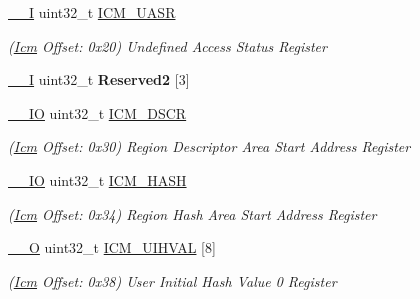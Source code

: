 \begin{DoxyCompactItemize}
\mbox{\label{structIcm_ad82efad8c6f9e75fd36dc3b5efd7c937}} 
\mbox{\hyperlink{core__cm7_8h_af63697ed9952cc71e1225efe205f6cd3}{\+\_\+\+\_\+I}} uint32\+\_\+t \mbox{\hyperlink{structIcm_ad82efad8c6f9e75fd36dc3b5efd7c937}{I\+C\+M\+\_\+\+U\+A\+SR}}
\begin{DoxyCompactList}\small\item\em (\mbox{\hyperlink{structIcm}{Icm}} Offset\+: 0x20) Undefined Access Status Register \end{DoxyCompactList}\item 
\mbox{\label{structIcm_a708a812dd1cdd6d52926abeb8b060f90}} 
\mbox{\hyperlink{core__cm7_8h_af63697ed9952cc71e1225efe205f6cd3}{\+\_\+\+\_\+I}} uint32\+\_\+t {\bfseries Reserved2} \mbox{[}3\mbox{]}
\item 
\mbox{\label{structIcm_a3c368d0b5b5729e3327f9c08da881548}} 
\mbox{\hyperlink{core__cm7_8h_aec43007d9998a0a0e01faede4133d6be}{\+\_\+\+\_\+\+IO}} uint32\+\_\+t \mbox{\hyperlink{structIcm_a3c368d0b5b5729e3327f9c08da881548}{I\+C\+M\+\_\+\+D\+S\+CR}}
\begin{DoxyCompactList}\small\item\em (\mbox{\hyperlink{structIcm}{Icm}} Offset\+: 0x30) Region Descriptor Area Start Address Register \end{DoxyCompactList}\item 
\mbox{\label{structIcm_a5b8f5e61dc6905c6d078257f6c1c24d7}} 
\mbox{\hyperlink{core__cm7_8h_aec43007d9998a0a0e01faede4133d6be}{\+\_\+\+\_\+\+IO}} uint32\+\_\+t \mbox{\hyperlink{structIcm_a5b8f5e61dc6905c6d078257f6c1c24d7}{I\+C\+M\+\_\+\+H\+A\+SH}}
\begin{DoxyCompactList}\small\item\em (\mbox{\hyperlink{structIcm}{Icm}} Offset\+: 0x34) Region Hash Area Start Address Register \end{DoxyCompactList}\item 
\mbox{\label{structIcm_a3532322a30b21f26e8948bdc21661c9b}} 
\mbox{\hyperlink{core__cm7_8h_a7e25d9380f9ef903923964322e71f2f6}{\+\_\+\+\_\+O}} uint32\+\_\+t \mbox{\hyperlink{structIcm_a3532322a30b21f26e8948bdc21661c9b}{I\+C\+M\+\_\+\+U\+I\+H\+V\+AL}} \mbox{[}8\mbox{]}
\begin{DoxyCompactList}\small\item\em (\mbox{\hyperlink{structIcm}{Icm}} Offset\+: 0x38) User Initial Hash Value 0 Register \end{DoxyCompactList}\item 

\end{DoxyCompactItemize}
